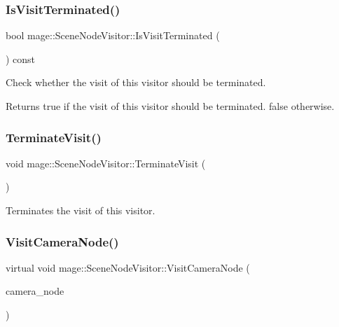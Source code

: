 \subsubsection{\texorpdfstring{Is\+Visit\+Terminated()}{IsVisitTerminated()}}
{\footnotesize\ttfamily bool mage\+::\+Scene\+Node\+Visitor\+::\+Is\+Visit\+Terminated (\begin{DoxyParamCaption}{ }\end{DoxyParamCaption}) const}

Check whether the visit of this visitor should be terminated.

\begin{DoxyReturn}{Returns}
{\ttfamily true} if the visit of this visitor should be terminated. {\ttfamily false} otherwise. 
\end{DoxyReturn}
\hypertarget{classmage_1_1_scene_node_visitor_a8fe1b3469cbb97d4086cb030128fa28c}{}\label{classmage_1_1_scene_node_visitor_a8fe1b3469cbb97d4086cb030128fa28c} 
\subsubsection{\texorpdfstring{Terminate\+Visit()}{TerminateVisit()}}
{\footnotesize\ttfamily void mage\+::\+Scene\+Node\+Visitor\+::\+Terminate\+Visit (\begin{DoxyParamCaption}{ }\end{DoxyParamCaption})\hspace{0.3cm}{\ttfamily [protected]}}

Terminates the visit of this visitor. \hypertarget{classmage_1_1_scene_node_visitor_a01d831e494396ab678ce0c29b008a398}{}\label{classmage_1_1_scene_node_visitor_a01d831e494396ab678ce0c29b008a398} 
\subsubsection{\texorpdfstring{Visit\+Camera\+Node()}{VisitCameraNode()}\hspace{0.1cm}{\footnotesize\ttfamily [1/2]}}
{\footnotesize\ttfamily virtual void mage\+::\+Scene\+Node\+Visitor\+::\+Visit\+Camera\+Node (\begin{DoxyParamCaption}\item[{\hyperlink{classmage_1_1_camera_node}{Camera\+Node} \&}]{camera\+\_\+node }\end{DoxyParamCaption})\hspace{0.3cm}{\ttfamily [virtual]}}

